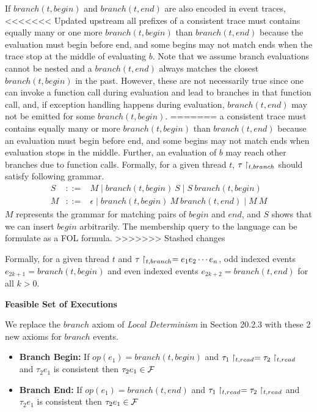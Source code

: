 \documentclass{article}
\begin{document}
\begin{enumerate}
If $branch(t, begin)$ and $branch(t,end)$ are also encoded in event traces,
<<<<<<< Updated upstream
all prefixes of a consistent trace must contains equally many or one more
$branch(t, begin)$ than $branch(t, end)$ because the evaluation must begin before end,
and some begins may not match ends when the trace stop at the middle of evaluating $b$.
Note that we assume branch evaluations cannot be nested and 
a $branch(t, end)$ always matches the closest $branch(t, begin)$ in the past.
However, these are not necessarily true since one can invoke a function call during
evaluation and lead to branches in that function call,
and, if exception handling happens during evaluation, $branch(t, end)$ may not be
emitted for some $branch(t, begin)$.   
=======
a consistent trace must contains equally many or more $branch(t, begin)$ than
$branch(t, end)$ because an evaluation must begin before end,
and some begins may not match ends when evaluation stops in the middle.
Further, an evaluation of $b$ may reach other branches due to function calls.
Formally, for a given thread $t$, $\tau\upharpoonright_{t,branch}$ should satisfy following grammar.
$$
\begin{array}{rcl}
	S & ::= &        M \mid branch(t, begin)\ S \mid S\ branch(t, begin) \\
	M & ::= & \epsilon \mid branch(t, begin)\ M\ branch(t, end) \mid M\ M
\end{array}
$$
$M$ represents the grammar for matching pairs of $begin$ and $end$,
and $S$ shows that we can insert $begin$ arbitrarily.
The membership query to the language can be formulate as a FOL formula.
>>>>>>> Stashed changes

Formally, for a given thread $t$ and $\tau\upharpoonright_{t,branch} = e_1 e_2 \cdots e_n$,
odd indexed events $e_{2k+1} = branch(t, begin)$ and even indexed events
$e_{2k+2} = branch(t, end)$ for all $k > 0$.


\textbf{Feasible Set of Executions}

We replace the $branch$ axiom of \emph{Local Determinism} in Section 20.2.3
with these 2 new axioms for $branch$ events.
\begin{itemize}
\item \textbf{Branch Begin:}\newline
	If $op(e_1) = branch(t, begin)$ and 
	$\tau_1\upharpoonright_{t,read} = \tau_2\upharpoonright_{t,read}$ and $\tau_2 e_1$ is consistent
	then $\tau_2 e_1 \in \mathcal{F}$
\item \textbf{Branch End:}\newline
	If $op(e_1) = branch(t, end)$ and 
	$\tau_1\upharpoonright_{t,read} = \tau_2\upharpoonright_{t,read}$ and $\tau_2 e_1$ is consistent
	then $\tau_2 e_1 \in \mathcal{F}$
\end{itemize}


\end{enumerate}
\end{document}
